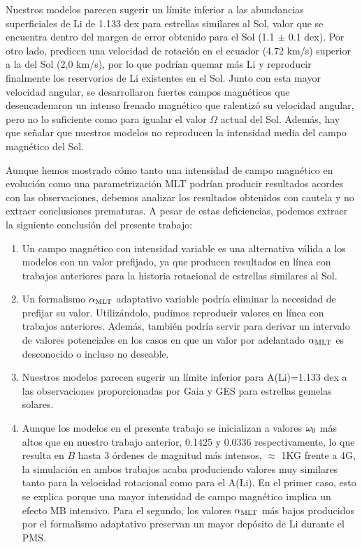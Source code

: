 Nuestros modelos parecen sugerir un límite inferior a las abundancias superficiales de Li de 1.133 dex para estrellas similares al Sol, valor que se encuentra dentro del margen de error obtenido para el Sol (1.1 $\pm$ 0.1 dex). Por otro lado, predicen una velocidad de rotación en el ecuador (4.72 km/s) superior a la del Sol (2,0 km/s), por lo que podrían quemar más Li y reproducir finalmente los reservorios de Li existentes en el Sol. Junto con esta mayor velocidad angular, se desarrollaron fuertes campos magnéticos que desencadenaron un intenso frenado magnético que ralentizó su velocidad angular, pero no lo suficiente como para igualar el valor $\Omega$ actual del Sol. Además, hay que señalar que nuestros modelos no reproducen la intensidad media del campo magnético del Sol.\par

Aunque hemos mostrado cómo tanto una intensidad de campo magnético en evolución como una parametrización MLT podrían producir resultados acordes con las observaciones, debemos analizar los resultados obtenidos con cautela y no extraer conclusiones prematuras. A pesar de estas deficiencias, podemos extraer la siguiente conclusión del presente trabajo:

\begin{enumerate}
	\item Un campo magnético con intensidad variable es una alternativa válida a los modelos con un valor prefijado, ya que producen resultados en línea con trabajos anteriores para la historia rotacional de estrellas similares al Sol.
	\item Un formalismo $\alpha_{\mathrm{MLT}}$ adaptativo variable podría eliminar la necesidad de prefijar su valor. Utilizándolo, pudimos reproducir valores en línea con trabajos anteriores. Además, también podría servir para derivar un intervalo de valores potenciales en los casos en que un valor por adelantado $\alpha_{\mathrm{MLT}}$ es desconocido o incluso no deseable.
	\item Nuestros modelos parecen sugerir un límite inferior para A(Li)=1.133 dex a las observaciones proporcionadas por Gaia y GES para estrellas gemelas solares.   
	\item Aunque los modelos en el presente trabajo se inicializan a valores $\omega_{\mathrm{0}}$ más altos que en nuestro trabajo anterior, 0.1425 y 0.0336 respectivamente, lo que resulta en $B$ hasta 3 órdenes de magnitud más intensos, $\approx$ 1KG frente a 4G, la simulación en ambos trabajos acaba produciendo valores muy similares tanto para la velocidad rotacional como para el A(Li). En el primer caso, esto se explica porque una mayor intensidad de campo magnético implica un efecto MB intensivo. Para el segundo, los valores $\alpha_{\mathrm{MLT}}$ más bajos producidos por el formalismo adaptativo preservan un mayor depósito de Li durante el PMS.
\end{enumerate}


